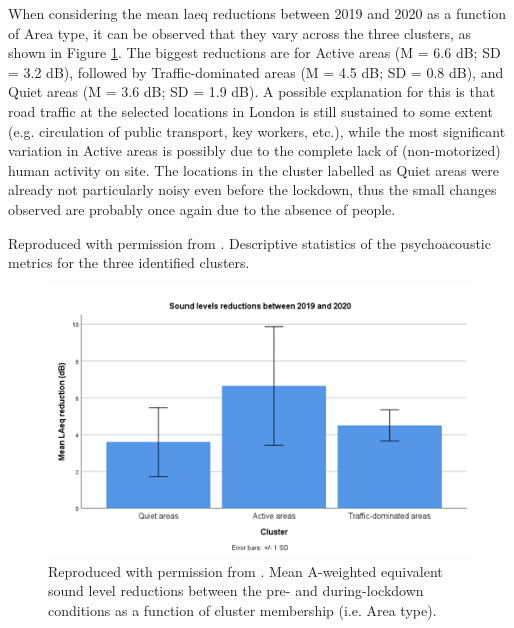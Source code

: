 When considering the mean \gls{laeq} reductions between 2019 and 2020 as a function of Area type, it can be observed that they vary across the three clusters, as shown in Figure \cref{fig:NsMapLockRedux}. The biggest reductions are for Active areas (M = 6.6 dB; SD = 3.2 dB), followed by Traffic-dominated areas (M = 4.5 dB; SD = 0.8 dB), and Quiet areas (M = 3.6 dB; SD = 1.9 dB). A possible explanation for this is that road traffic at the selected locations in London is still sustained to some extent (e.g. circulation of public transport, key workers, etc.), while the most significant variation in Active areas is possibly due to the complete lack of (non-motorized) human activity on site. The locations in the cluster labelled as Quiet areas were already not particularly noisy even before the lockdown, thus the small changes observed are probably once again due to the absence of people.

\begin{table}
  \caption{Reproduced with permission from \citet{Aletta2020Assessing}. Descriptive statistics of the psychoacoustic metrics for the three identified clusters. \label{tab:NsMapLockClust}}
  \centering
  
\end{table}

\begin{figure}
    \caption{Reproduced with permission from \citet{Aletta2020Assessing}. Mean A-weighted equivalent sound level reductions between the pre- and during-lockdown conditions as a function of cluster membership (i.e. Area type). \label{fig:NsMapLockRedux}}
  \centering
  \includegraphics[width=\textwidth]{Figures/NoiseMappingLockdown Fig 8.png}
\end{figure}


